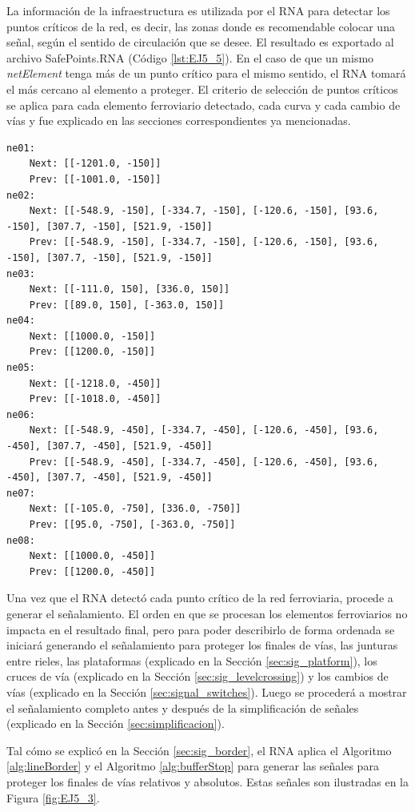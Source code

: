 	La información de la infraestructura es utilizada por el RNA para detectar los puntos críticos de la red, es decir, las zonas donde es recomendable colocar una señal, según el sentido de circulación que se desee. El resultado es exportado al archivo SafePoints.RNA (Código \ref{lst:EJ5_5}). En el caso de que un mismo \textit{netElement} tenga más de un punto crítico para el mismo sentido, el RNA tomará el más cercano al elemento a proteger. El criterio de selección de puntos críticos se aplica para cada elemento ferroviario detectado, cada curva y cada cambio de vías y fue explicado en las secciones correspondientes ya mencionadas.
	
	\begin{lstlisting}[language = {}, caption = SafePoints.RNA, label = {lst:EJ5_5}]
ne01:
	Next: [[-1201.0, -150]]
	Prev: [[-1001.0, -150]]
ne02:
	Next: [[-548.9, -150], [-334.7, -150], [-120.6, -150], [93.6, -150], [307.7, -150], [521.9, -150]]
	Prev: [[-548.9, -150], [-334.7, -150], [-120.6, -150], [93.6, -150], [307.7, -150], [521.9, -150]]
ne03:
	Next: [[-111.0, 150], [336.0, 150]]
	Prev: [[89.0, 150], [-363.0, 150]]
ne04:
	Next: [[1000.0, -150]]
	Prev: [[1200.0, -150]]
ne05:
	Next: [[-1218.0, -450]]
	Prev: [[-1018.0, -450]]
ne06:
	Next: [[-548.9, -450], [-334.7, -450], [-120.6, -450], [93.6, -450], [307.7, -450], [521.9, -450]]
	Prev: [[-548.9, -450], [-334.7, -450], [-120.6, -450], [93.6, -450], [307.7, -450], [521.9, -450]]
ne07:
	Next: [[-105.0, -750], [336.0, -750]]
	Prev: [[95.0, -750], [-363.0, -750]]
ne08:
	Next: [[1000.0, -450]]
	Prev: [[1200.0, -450]]
	\end{lstlisting}	
	
	Una vez que el RNA detectó cada punto crítico de la red ferroviaria, procede a generar el señalamiento. El orden en que se procesan los elementos ferroviarios no impacta en el resultado final, pero para poder describirlo de forma ordenada se iniciará generando el señalamiento para proteger los finales de vías, las junturas entre rieles, las plataformas (explicado en la Sección \ref{sec:sig_platform}), los cruces de vía (explicado en la Sección \ref{sec:sig_levelcrossing}) y los cambios de vías (explicado en la Sección \ref{sec:signal_switches}). Luego se procederá a mostrar el señalamiento completo antes y después de la simplificación de señales (explicado en la Sección \ref{sec:simplificacion}). 
	
	Tal cómo se explicó en la Sección \ref{sec:sig_border}, el RNA aplica el Algoritmo \ref{alg:lineBorder} y el Algoritmo \ref{alg:bufferStop} para generar las señales para proteger los finales de vías relativos y absolutos. Estas señales son ilustradas en la Figura \ref{fig:EJ5_3}.

